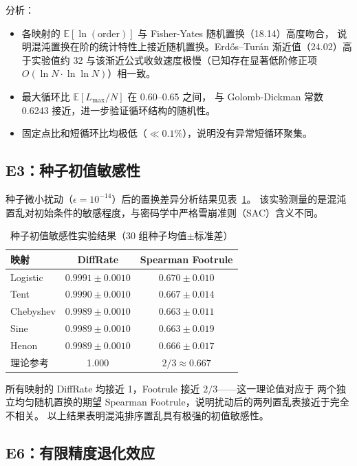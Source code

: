 \documentclass[12pt,a4paper]{ctexrep}
\begin{document}
分析：
\begin{itemize}
  \item 各映射的 $\mathbb{E}[\ln(\text{order})]$ 与 Fisher-Yates 随机置换（18.14）高度吻合，
  说明混沌置换在阶的统计特性上接近随机置换。Erdős--Turán 渐近值（24.02）高于实验值约 32%
  与该渐近公式收敛速度极慢（已知存在显著低阶修正项 $O(\ln N \cdot \ln\ln N)$）\cite{erdos}相一致。
  \item 最大循环比 $\mathbb{E}[L_{\max}/N]$ 在 0.60--0.65 之间，
  与 Golomb-Dickman 常数 0.6243 接近，进一步验证循环结构的随机性。
  \item 固定点比和短循环比均极低（$\ll 0.1\%$），说明没有异常短循环聚集。
\end{itemize}

\subsection{E3：种子初值敏感性}

种子微小扰动（$\epsilon = 10^{-14}$）后的置换差异分析结果见表~\ref{tab:avalanche}。
该实验测量的是混沌置乱对初始条件的敏感程度，与密码学中严格雪崩准则（SAC）含义不同。

\begin{table}[H]
  \centering
  \caption{种子初值敏感性实验结果（30 组种子均值$\pm$标准差）}
  \label{tab:avalanche}
  \begin{tabular}{lcc}
    \toprule
    映射 & DiffRate & Spearman Footrule \\
    \midrule
    Logistic & $0.9991\pm0.0010$ & $0.670\pm0.010$ \\
    Tent & $0.9990\pm0.0010$ & $0.667\pm0.014$ \\
    Chebyshev & $0.9989\pm0.0010$ & $0.663\pm0.011$ \\
    Sine & $0.9989\pm0.0010$ & $0.663\pm0.019$ \\
    Henon & $0.9989\pm0.0010$ & $0.666\pm0.017$ \\
    理论参考 & 1.000 & $2/3\approx0.667$ \\
    \bottomrule
  \end{tabular}
\end{table}

所有映射的 DiffRate 均接近 1，Footrule 接近 $2/3$——这一理论值对应于
两个独立均匀随机置换的期望 Spearman Footrule，说明扰动后的两列置乱表接近于完全不相关。
以上结果表明混沌排序置乱具有极强的初值敏感性。

\subsection{E6：有限精度退化效应}
\end{document}
